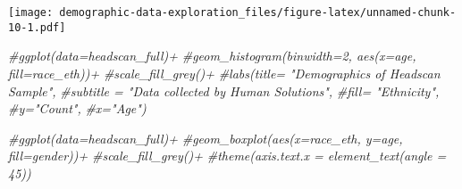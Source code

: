 \documentclass[
]{article}
\newenvironment{Shaded}{\begin{snugshade}}{\end{snugshade}}
\newcommand{\CommentTok}[1]{\textcolor[rgb]{0.56,0.35,0.01}{\textit{#1}}}
\begin{document}
\texttt{[image: demographic-data-exploration\_files/figure-latex/unnamed-chunk-10-1.pdf]}

\begin{Shaded}
\begin{Highlighting}[]
\CommentTok{\#ggplot(data=headscan\_full)+}
  \CommentTok{\#geom\_histogram(binwidth=2, aes(x=age, fill=race\_eth))+}
  \CommentTok{\#scale\_fill\_grey()+}
  \CommentTok{\#labs(title= "Demographics of Headscan Sample",}
       \CommentTok{\#subtitle = "Data collected by Human Solutions",}
       \CommentTok{\#fill= "Ethnicity",}
       \CommentTok{\#y="Count",}
       \CommentTok{\#x="Age")}
\end{Highlighting}
\end{Shaded}

\begin{Shaded}
\begin{Highlighting}[]
\CommentTok{\#ggplot(data=headscan\_full)+}
  \CommentTok{\#geom\_boxplot(aes(x=race\_eth, y=age, fill=gender))+}
  \CommentTok{\#scale\_fill\_grey()+}
  \CommentTok{\#theme(axis.text.x = element\_text(angle = 45))}
\end{Highlighting}
\end{Shaded}
\end{document}

